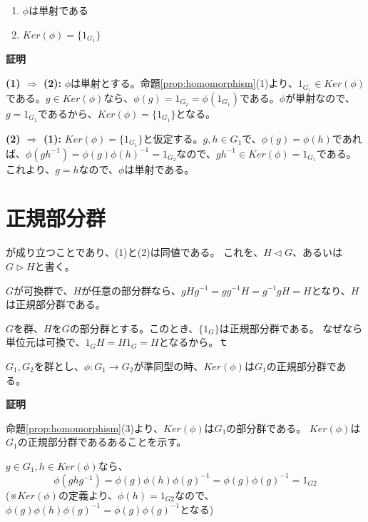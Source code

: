\documentclass[dvipdfmx,autodetect-engine]{jsarticle}
\begin{document}
\begin{enumerate}
\renewcommand{\labelenumi}{(\arabic{enumi})}
\item $\phi$は単射である
\item $Ker(\phi) = \{1_{G_1}\}$
\end{enumerate}

{\bf 証明}

{\bf (1) $\Rightarrow$ (2):} $\phi$は単射とする。命題\ref{prop:homomorphism}(1)より、$1_{G_1} \in Ker({\phi})$である。$g \in Ker(\phi)$なら、$\phi(g) = 1_{G_2} = \phi(1_{G_1})$である。$\phi$が単射なので、$g = 1_{G_1}$であるから、$Ker(\phi) = \{1_{G_1}\}$となる。

{\bf (2) $\Rightarrow$ (1):} $Ker(\phi) = \{1_{G_1}\}$と仮定する。$g, h \in G_1$で、$\phi(g) = \phi(h)$であれば、$\phi(gh^{-1}) = \phi(g)\phi(h)^{-1} = 1_{G_2}$なので、$gh^{-1} \in Ker(\phi) = {1_{G_1}}$である。これより、$g = h$なので、$\phi$は単射である。

\section{正規部分群}

\label{defi:normalGroup}

が成り立つことであり、(1)と(2)は同値である。
これを、$H \triangleleft G$、あるいは$G \triangleright H$と書く。

\exam $G$が可換群で、$H$が任意の部分群なら、$gHg^{-1} = gg^{-1}H = g^{-1}gH = H$となり、$H$は正規部分群である。

\exam $G$を群、$H$を$G$の部分群とする。このとき、$\{1_G\}$は正規部分群である。
なぜなら単位元は可換で、$1_GH = H1_G = H$となるから。ｔ

\prop $G_1, G_2$を群とし、$\phi: G_1 \to G_2$が準同型の時、$Ker(\phi)$は$G_1$の正規部分群である。

{\bf 証明}

命題\ref{prop:homomorphism}(3)より、$Ker(\phi)$は$G_1$の部分群である。
$Ker(\phi)$は$G_1$の正規部分群であるあることを示す。

$g \in G_1, h \in Ker(\phi)$なら、
$$
\phi(ghg^{-1}) = \phi(g)\phi(h)\phi(g)^{-1} = \phi(g)\phi(g)^{-1} = 1_{G2}
$$
(※$Ker(\phi)$の定義より、$\phi(h) = 1_{G2}$なので、$\phi(g)\phi(h)\phi(g)^{-1} = \phi(g)\phi(g)^{-1}$となる)
\end{document}
